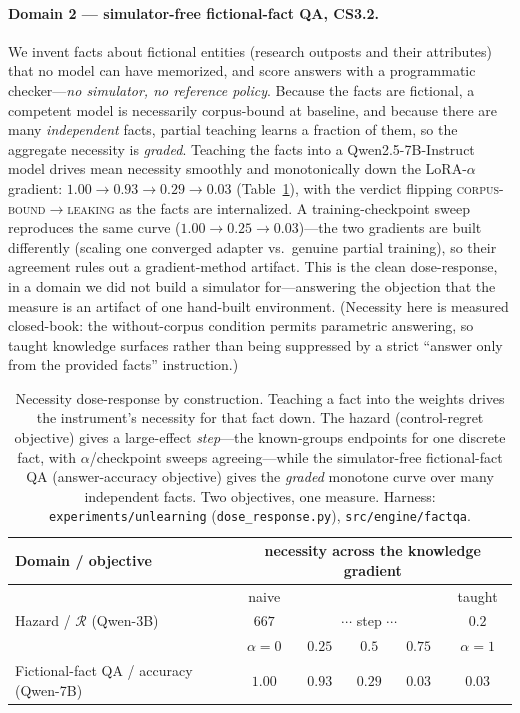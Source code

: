 \documentclass{article}
\newcommand{\regret}{\mathcal{R}}
\begin{document}
\paragraph{Domain 2 --- simulator-free fictional-fact QA, CS3.2.} We invent facts about fictional entities
(research outposts and their attributes) that no model can have memorized, and score answers with a
programmatic checker---\emph{no simulator, no reference policy}. Because the facts are fictional, a
competent model is necessarily corpus-bound at baseline, and because there are many \emph{independent}
facts, partial teaching learns a fraction of them, so the aggregate necessity is \emph{graded}.
Teaching the facts into a Qwen2.5-7B-Instruct model drives mean necessity smoothly and monotonically
down the LoRA-$\alpha$ gradient: $1.00\!\to\!0.93\!\to\!0.29\!\to\!0.03$ (Table~\ref{tab:dose}), with
the verdict flipping \textsc{corpus-bound}$\to$\textsc{leaking} as the facts are internalized. A
training-checkpoint sweep reproduces the same curve ($1.00\!\to\!0.25\!\to\!0.03$)---the two gradients
are built differently (scaling one converged adapter vs.\ genuine partial training), so their
agreement rules out a gradient-method artifact. This is the clean dose-response, in a domain we did
not build a simulator for---answering the objection that the measure is an artifact of one hand-built
environment. (Necessity here is measured closed-book:
the without-corpus condition permits parametric answering, so taught knowledge surfaces rather than
being suppressed by a strict ``answer only from the provided facts'' instruction.)

\begin{table}[t]
\centering\small
\begin{tabular}{@{}lccccc@{}}
\toprule
Domain / objective & \multicolumn{5}{c}{necessity across the knowledge gradient} \\
\midrule
& naive & & & & taught \\
Hazard / $\regret$ (Qwen-3B) & $667$ & \multicolumn{3}{c}{$\cdots$ step $\cdots$} & $0.2$ \\
\midrule
& $\alpha{=}0$ & $0.25$ & $0.5$ & $0.75$ & $\alpha{=}1$ \\
Fictional-fact QA / accuracy (Qwen-7B) & $1.00$ & $0.93$ & $0.29$ & $0.03$ & $0.03$ \\
\bottomrule
\end{tabular}
\caption{Necessity dose-response by construction. Teaching a fact into the weights drives the
instrument's necessity for that fact down. The hazard (control-regret objective) gives a
large-effect \emph{step}---the known-groups endpoints for one discrete fact, with $\alpha$/checkpoint
sweeps agreeing---while the simulator-free fictional-fact QA (answer-accuracy objective) gives the
\emph{graded} monotone curve over many independent facts. Two objectives, one measure. Harness:
\texttt{experiments/unlearning} (\texttt{dose\_response.py}), \texttt{src/engine/factqa}.}
\label{tab:dose}
\end{table}
\end{document}
